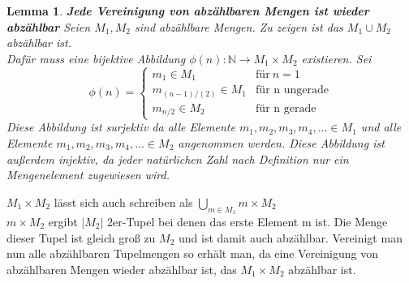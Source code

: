 \documentclass{article}
\begin{document}
        \newtheorem{lemma}{Lemma}
        \begin{lemma}
            \textbf{Jede Vereinigung von abzählbaren Mengen ist wieder abzählbar}
            Seien \(M_1, M_2\) sind abzählbare Mengen. Zu zeigen ist das \(M_1 \cup M_2\) abzählbar ist. \\
            Dafür muss eine bijektive Abbildung \(\phi(n): \mathbb{N} \to M_1 \times M_2 \) existieren.
            Sei 
            \begin{equation*}
                \phi(n) =
                \begin{cases}
                    m_1 \in M_1 & \text{für} \: n = 1 \\
                    m_{(n-1)/(2)} \in M_1 & \text{für n ungerade} \\
                    m_{n/2} \in M_2 & \text{für n gerade}
                \end{cases}
            \end{equation*}
            Diese Abbildung ist surjektiv da alle Elemente \(m_1, m_2, m_3, m_4, ... \in M_1\) und alle Elemente \(m_1, m_2, m_3, m_4, ... \in M_2\) angenommen werden.
            Diese Abbildung ist außerdem injektiv, da jeder natürlichen Zahl nach Definition nur ein Mengenelement zugewiesen wird.

        \end{lemma}
        \(M_1 \times M_2\) lässt sich auch schreiben als \(\bigcup_{m \in M_1} m \times M_2 \) \\
        \(m \times M_2\) ergibt \(|M_2|\) 2er-Tupel bei denen das erste Element m ist. Die Menge dieser Tupel ist gleich groß
        zu \(M_2\) und ist damit auch abzählbar.
        Vereinigt man nun alle abzählbaren Tupelmengen so erhält man, da eine Vereinigung von abzählbaren Mengen wieder abzählbar ist,
        das \(M_1 \times M_2 \) abzählbar ist. 
\end{document}
